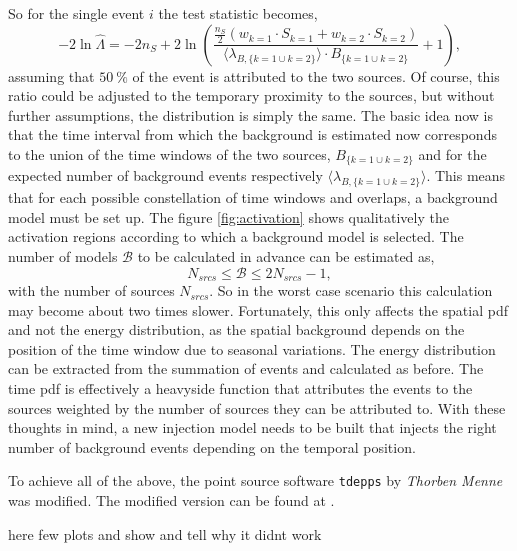 So for the single event $i$ the test statistic becomes,
\begin{equation}
    -2\ln{\hat{\Lambda}} =-2n_S +2\ln\left(\frac{\frac{n_S}{2}(w_{k=1}\cdot S_{k=1} + w_{k=2} \cdot S_{k=2})}{\langle\lambda_{B,\{k=1\cup k=2\}}\rangle \cdot B_{\{k=1\cup k=2\}}}+1\right) \label{eq:simple_example},
\end{equation}
assuming that $\SI{50}{\percent}$ of the event is attributed to the two sources.
Of course, this ratio could be adjusted to the temporary proximity to the sources, but without further assumptions, the distribution is simply the same.
The basic idea now is that the time interval from which the background is estimated now corresponds to the union of the time windows of the two sources, $B_{\{k=1\cup k=2\}}$ and for the expected number of background events respectively $\langle\lambda_{B,\{k=1\cup k=2\}}\rangle$.
This means that for each possible constellation of time windows and overlaps, a background model must be set up.
The figure \ref{fig:activation} shows qualitatively the activation regions according to which a background model is selected.
The number of models $\mathcal{B}$ to be calculated in advance can be estimated as,
\begin{equation}
  N_{srcs} \leq \mathcal{B}\leq 2N_{srcs}-1, \label{eq:number_of_models}
\end{equation}
with the number of sources $N_{srcs}$.
So in the worst case scenario this calculation may become about two times slower.
Fortunately, this only affects the spatial pdf and not the energy distribution, as the spatial background depends on the position of the time window due to seasonal variations.
The energy distribution can be extracted from the summation of events and calculated as before.
The time pdf is effectively a heavyside function that attributes the events to the sources weighted by the number of sources they can be attributed to.
With these thoughts in mind, a new injection model needs to be built that injects the right number of background events depending on the temporal position.

To achieve all of the above, the point source software \texttt{tdepps} by \textit{Thorben Menne} \cite{tdepps_1} was modified.
The modified version can be found at \cite{tdepps_2}.

here few plots and show and tell why it didnt work
